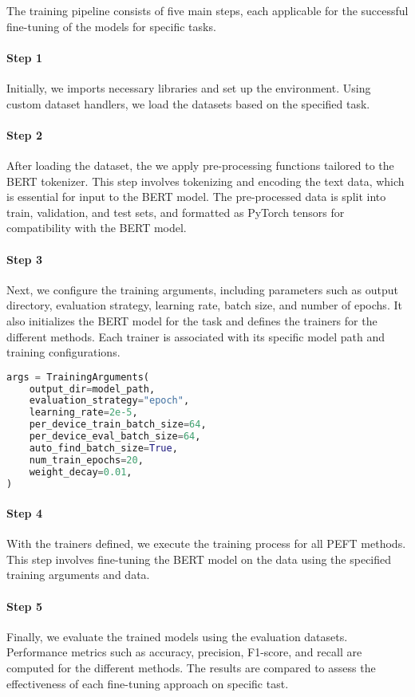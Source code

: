 
The training pipeline consists of five main steps, each applicable for the successful fine-tuning of the models for specific tasks. 

\paragraph{Step 1} Initially, we imports necessary libraries and set up the environment. Using custom dataset handlers, we load the datasets based on the specified task. 

\paragraph{Step 2} After loading the dataset, the we apply pre-processing functions tailored to the BERT tokenizer. This step involves tokenizing and encoding the text data, which is essential for input to the BERT model. The pre-processed data is split into train, validation, and test sets, and formatted as PyTorch tensors for compatibility with the BERT model.

\paragraph{Step 3} Next, we configure the training arguments, including parameters such as output directory, evaluation strategy, learning rate, batch size, and number of epochs. It also initializes the BERT model for the task and defines the trainers for the different methods. Each trainer is associated with its specific model path and training configurations.
\begin{lstlisting}[language=Python, caption={Training Arguments}, label={lst:training_arguments}]
args = TrainingArguments(
    output_dir=model_path,
    evaluation_strategy="epoch",
    learning_rate=2e-5,
    per_device_train_batch_size=64,
    per_device_eval_batch_size=64,
    auto_find_batch_size=True,
    num_train_epochs=20,
    weight_decay=0.01,
)
\end{lstlisting}



\paragraph{Step 4} With the trainers defined, we execute the training process for all PEFT methods. This step involves fine-tuning the BERT model on the data using the specified training arguments and data. 

\paragraph{Step 5} Finally, we evaluate the trained models using the evaluation datasets. Performance metrics such as accuracy, precision, F1-score, and recall are computed for the different methods. The results are compared to assess the effectiveness of each fine-tuning approach on specific tast.
